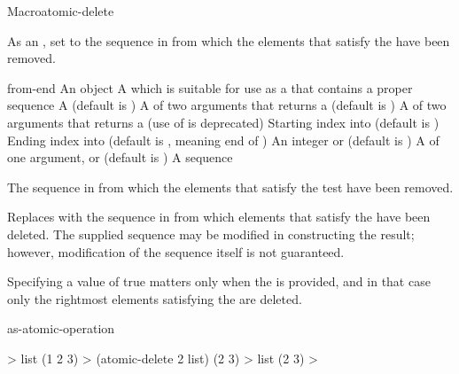 \begin{functiondoc}{Macro}{atomic-delete}{
     
    \returns{} }
%

\fnsyntax

\fnpurpose As an , set  to the
sequence in  from which the elements that satisfy the
 have been removed.

\fnpackage {}

\fnmodule {}

\fnargs
\begin{args}{from-end}
\arg[item] An object
\arg[place] A  which is suitable for use as a
 that contains a proper sequence
 A  (default is \nil)
\arg[test] A  of two arguments that returns a
 (default is ) 
 A  of two arguments that returns a
 (use of  is deprecated)
\arg[start] Starting index into  (default is )
\arg[end] Ending index into  (default is \nil, meaning
end of )
\arg[count] An integer or \nil{} (default is \nil)
\arg[key] A  of one argument, or \nil{} (default is \nil)
\arg[sequence] A sequence
\end{args}

\fnreturns The sequence in  from which the elements that
satisfy the test have been removed.

\fndescription Replaces  with the sequence in
 from which elements that satisfy the 
have been deleted.  The supplied  sequence may be modified
in constructing the result; however, modification of the sequence itself is
not guaranteed.

Specifying a  value of true matters only when
the  is provided, and in that case only the rightmost
 elements satisfying the  are deleted.

\begin{alsos}{as-atomic-operation}
\end{alsos}

\fnexample
%
\W\supp
\begin{example}
  > list
  (1 2 3)
  > (atomic-delete 2 list)
  (2 3)
  > list
  (2 3)
  >
\end{example}

\end{functiondoc}

